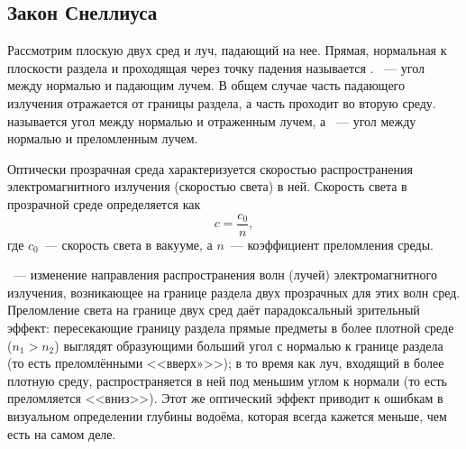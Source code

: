 \subsection{Закон Снеллиуса}
Рассмотрим плоскую  двух сред и луч, падающий на нее. Прямая, нормальная к плоскости раздела и проходящая через точку падения называется . ~--- угол между нормалью и падающим лучем. В общем случае часть падающего излучения отражается от границы раздела, а часть проходит во вторую среду.  называется угол между нормалью и отраженным лучем, а ~--- угол между нормалью и преломленным лучем.

Оптически прозрачная среда характеризуется скоростью распространения электромагнитного излучения (скоростью света) в ней. Скорость света в прозрачной среде определяется как
\begin{equation}
    c = \frac{c_0}{n},
\end{equation}
где $c_0$~--- скорость света в вакууме, а $n$~--- коэффициент преломления среды.

~--- изменение направления распространения волн (лучей) электромагнитного излучения, возникающее на границе раздела двух прозрачных для этих волн сред. Преломление света на границе двух сред даёт парадоксальный зрительный эффект: пересекающие границу раздела прямые предметы в более плотной среде ($n_1 >  n_2$) выглядят образующими больший угол с нормалью к границе раздела (то есть преломлёнными <<вверх»>>); в то время как луч, входящий в более плотную среду, распространяется в ней под меньшим углом к нормали (то есть преломляется <<вниз>>). Этот же оптический эффект приводит к ошибкам в визуальном определении глубины водоёма, которая всегда кажется меньше, чем есть на самом деле.

